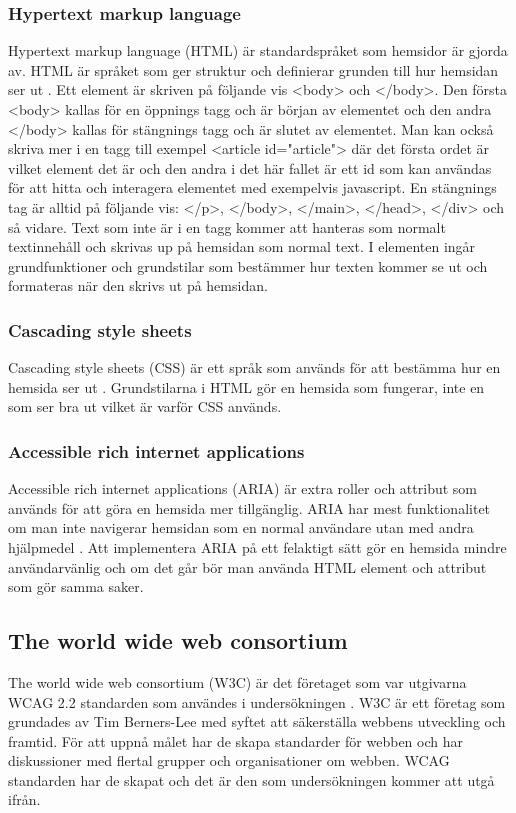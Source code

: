 \documentclass[11p]{article}
\begin{document}
    \subsubsection{Hypertext markup language}
    Hypertext markup language (HTML) är standardspråket som hemsidor är gjorda av.
    HTML är språket som ger struktur och definierar grunden till hur hemsidan ser ut \parencite{HTML}.
    Ett element är skriven på följande vis <body> och </body>.
    Den första <body> kallas för en öppnings tagg och är början av elementet och den andra </body> kallas för stängnings tagg och är slutet av elementet.
    Man kan också skriva mer i en tagg till exempel <article id="article"> där det första ordet är vilket element det är och den andra i det här fallet är ett id som kan användas för att hitta och interagera elementet med exempelvis javascript.
    En stängnings tag är alltid på följande vis: </p>, </body>, </main>, </head>, </div> och så vidare.
    Text som inte är i en tagg kommer att hanteras som normalt textinnehåll och skrivas up på hemsidan som normal text.
    I elementen ingår grundfunktioner och grundstilar som bestämmer hur texten kommer se ut och formateras när den skrivs ut på hemsidan.

    \subsubsection{Cascading style sheets}
    Cascading style sheets (CSS) är ett språk som används för att bestämma hur en hemsida ser ut \parencite{CSS}.
    Grundstilarna i HTML gör en hemsida som fungerar, inte en som ser bra ut vilket är varför CSS används.

    \subsubsection{Accessible rich internet applications}
    Accessible rich internet applications (ARIA) är extra roller och attribut som används för att göra en hemsida mer tillgänglig.
    ARIA har mest funktionalitet om man inte navigerar hemsidan som en normal användare utan med andra hjälpmedel \parencite{ARIA}.
    Att implementera ARIA på ett felaktigt sätt gör en hemsida mindre användarvänlig och om det går bör man använda HTML element och attribut som gör samma saker.
    
    \subsection{The world wide web consortium}
    The world wide web consortium (W3C) är det företaget som var utgivarna WCAG 2.2 standarden som användes i undersökningen \parencite{W3C}.
    W3C är ett företag som grundades av Tim Berners-Lee med syftet att säkerställa webbens utveckling och framtid.
    För att uppnå målet har de skapa standarder för webben och har diskussioner med flertal grupper och organisationer om webben.
    WCAG standarden har de skapat och det är den som undersökningen kommer att utgå ifrån.
\end{document}
